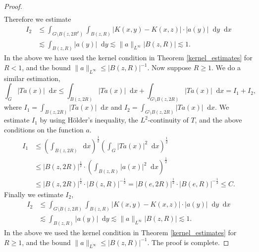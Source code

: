 \documentclass[10pt,a4paper]{amsart}
\newcommand*\diff{\mathop{}\!\mathrm{d}}
\begin{document}
\begin{proof}
\begin{equation*}
\begin{aligned}
    \end{aligned}
    \end{equation*}
    Therefore we estimate 
    \begin{equation*}
    \begin{aligned}
        I_2&\leq\int_{G\setminus B(z,2R^\rho)}\int_{B(z,R)}|K(x,y)-K(x,z)|\cdot|a(y)|\diff{y}\diff{x}\\
        &\lesssim\int_{B(z,R)}|a(y)|\diff{y}\lesssim\|a\|_{L^{\infty}}|B(z,R)|\lesssim 1.
    \end{aligned}
    \end{equation*}
    In the above we have used the kernel condition in Theorem \ref{kernel_estimates} for $R<1$, and the bound $\|a\|_{L^{\infty}}\leq |B(z,R)|^{-1}$. Now suppose $R\geq 1$. We do a similar estimation,
    \begin{equation*}
        \int_{G}|Ta(x)|\diff{x}\leq\int_{B(z,2R)}|Ta(x)|\diff{x}+\int_{G\setminus B(z,2R)}|Ta(x)|\diff{x}=I_1+I_2,
    \end{equation*}
    where $I_1=\int_{B(z,2R)}|Ta(x)|\diff{x}$ and $I_2=\int_{G\setminus B(z,2R)}|Ta(x)|\diff{x}$. We estimate $I_1$ by using Hölder's inequality, the $L^2$-continuity of $T$, and the above conditions on the function $a$.
     \begin{equation*}
        \begin{aligned}
        I_1&\leq\left(\int_{B(z,2R)}\diff{x}\right)^{\frac{1}{2}}\left(\int_{G}|Ta(x)|^2\diff{x}\right)^{\frac{1}{2}}\\
        &\leq|B(z,2R)|^{\frac{1}{2}}\cdot\left(\int_{B(z,R)}|a(x)|^2\diff{x}\right)^{\frac{1}{2}}\\
        &\leq|B(z,2R)|^{\frac{1}{2}}\cdot|B(z,R)|^{-\frac{1}{2}}=|B(e,2R)|^{\frac{1}{2}}\cdot|B(e,R)|^{-\frac{1}{2}}\leq C.
    \end{aligned}
    \end{equation*}
    Finally we estimate $I_2$,
   \begin{equation*}
    \begin{aligned}
        I_2&\leq\int_{G\setminus B(z,2R)}\int_{B(z,R)}|K(x,y)-K(x,z)|\cdot|a(y)|\diff{y}\diff{x}\\
        &\lesssim\int_{B(z,R)}|a(y)|\diff{y}\lesssim\|a\|_{L^{\infty}}|B(z,R)|\lesssim 1.
    \end{aligned}
    \end{equation*}
    In the above we used the kernel condition in Theorem \ref{kernel_estimates} for $R\geq 1$, and the bound $\|a\|_{L^{\infty}}\leq |B(z,R)|^{-1}$. The proof is complete. 
\end{proof}
\end{document}
